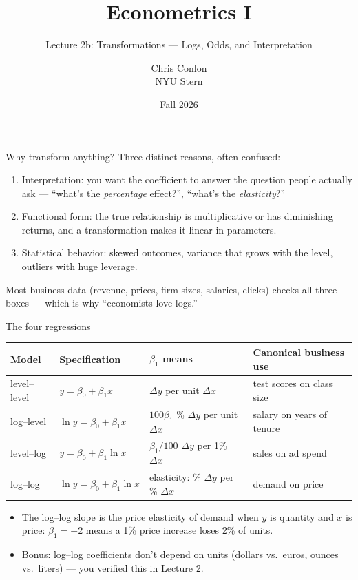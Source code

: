 \documentclass[aspectratio=169,11pt]{beamer}
\title[Transformations]{ Econometrics I}
\subtitle{Lecture 2b: Transformations --- Logs, Odds, and Interpretation}
\author{Chris Conlon \\NYU Stern}
\date{Fall 2026}
\begin{document}
\maketitle


\begin{frame}{Why transform anything?}
Three distinct reasons, often confused:
\begin{enumerate}
	\item \alert{Interpretation}: you want the coefficient to answer the question
	people actually ask --- ``what's the \emph{percentage} effect?'', ``what's the
	\emph{elasticity}?''

	\medskip
	\item \alert{Functional form}: the true relationship is multiplicative or has
	diminishing returns, and a transformation makes it linear-in-parameters.

	\medskip
	\item \alert{Statistical behavior}: skewed outcomes, variance that grows with the
	level, outliers with huge leverage.
\end{enumerate}
\bigskip
Most business data (revenue, prices, firm sizes, salaries, clicks) checks all three
boxes --- which is why ``economists love logs.''
\end{frame}


\begin{frame}{The four regressions}
\begin{center}
\begin{tabular}{llll}
\hline
Model & Specification & $\beta_1$ means & Canonical business use \\
\hline
level--level & $y = \beta_0 + \beta_1 x$ & $\Delta y$ per unit $\Delta x$ & test scores on class size \\
log--level & $\ln y = \beta_0 + \beta_1 x$ & $100 \beta_1$ \% $\Delta y$ per unit $\Delta x$ & salary on years of tenure \\
level--log & $y = \beta_0 + \beta_1 \ln x$ & $\beta_1 / 100$ $\Delta y$ per 1\% $\Delta x$ & sales on ad spend \\
log--log & $\ln y = \beta_0 + \beta_1 \ln x$ & \alert{elasticity}: \% $\Delta y$ per \% $\Delta x$ & demand on price \\
\hline
\end{tabular}
\end{center}
\bigskip
\begin{itemize}
	\item The log--log slope is the \alert{price elasticity of demand} when $y$ is
	quantity and $x$ is price: $\beta_1 = -2$ means a 1\% price increase loses 2\% of
	units.
	\item Bonus: log--log coefficients don't depend on units (dollars vs.\ euros,
	ounces vs.\ liters) --- you verified this in Lecture 2.
\end{itemize}
\end{frame}
\end{document}
